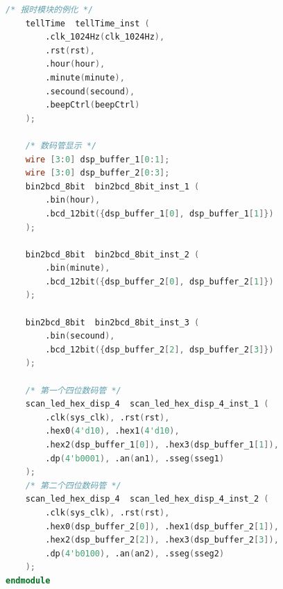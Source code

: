 \documentclass{article}
\begin{document}
\begin{lstlisting}[language=Verilog, caption={添加报时模块后的Top文件}]
    /* 报时模块的例化 */
    tellTime  tellTime_inst (
        .clk_1024Hz(clk_1024Hz),
        .rst(rst),
        .hour(hour),
        .minute(minute),
        .secound(secound),
        .beepCtrl(beepCtrl)
    );

    /* 数码管显示 */
    wire [3:0] dsp_buffer_1[0:1];
    wire [3:0] dsp_buffer_2[0:3];
    bin2bcd_8bit  bin2bcd_8bit_inst_1 (
        .bin(hour),
        .bcd_12bit({dsp_buffer_1[0], dsp_buffer_1[1]})
    );

    bin2bcd_8bit  bin2bcd_8bit_inst_2 (
        .bin(minute),
        .bcd_12bit({dsp_buffer_2[0], dsp_buffer_2[1]})
    );

    bin2bcd_8bit  bin2bcd_8bit_inst_3 (
        .bin(secound),
        .bcd_12bit({dsp_buffer_2[2], dsp_buffer_2[3]})
    );
    
    /* 第一个四位数码管 */
    scan_led_hex_disp_4  scan_led_hex_disp_4_inst_1 (
        .clk(sys_clk), .rst(rst),
        .hex0(4'd10), .hex1(4'd10),
        .hex2(dsp_buffer_1[0]), .hex3(dsp_buffer_1[1]),
        .dp(4'b0001), .an(an1), .sseg(sseg1)
    );
    /* 第二个四位数码管 */
    scan_led_hex_disp_4  scan_led_hex_disp_4_inst_2 (
        .clk(sys_clk), .rst(rst),
        .hex0(dsp_buffer_2[0]), .hex1(dsp_buffer_2[1]),
        .hex2(dsp_buffer_2[2]), .hex3(dsp_buffer_2[3]),
        .dp(4'b0100), .an(an2), .sseg(sseg2)
    );
endmodule
\end{lstlisting}
\end{document}
